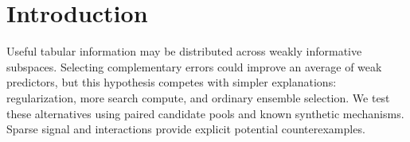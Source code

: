 \section{Introduction}
Useful tabular information may be distributed across weakly informative subspaces.
Selecting complementary errors could improve an average of weak predictors, but
this hypothesis competes with simpler explanations: regularization, more search
compute, and ordinary ensemble selection. We test these alternatives using paired
candidate pools and known synthetic mechanisms. Sparse signal and interactions
provide explicit potential counterexamples.

